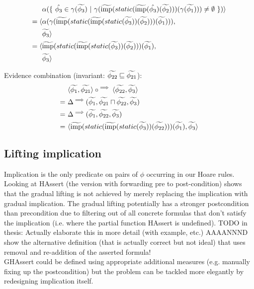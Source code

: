 \documentclass[11pt,a4paper]{article}
\begin{document}
\begin{align*}
&\alpha(\{~ \hat{\phi_3} \in \gamma(\widetilde{\phi_3}) ~|~ \gamma(\widetilde{\textrm{imp}}(static(\widetilde{\textrm{imp}}(\hat{\phi_3})(\widetilde{\phi_2})))(\gamma(\widetilde{\phi_1}))) \neq \emptyset  ~\})
\rangle\\
= \langle 
&\alpha(\gamma(\widetilde{\textrm{imp}}(static(\widetilde{\textrm{imp}}(static(\widetilde{\phi_3}))(\widetilde{\phi_2})))(\widetilde{\phi_1}))), \\
&\widetilde{\phi_3}
\rangle\\
= \langle 
&\widetilde{\textrm{imp}}(static(\widetilde{\textrm{imp}}(static(\widetilde{\phi_3}))(\widetilde{\phi_2})))(\widetilde{\phi_1}), \\
&\widetilde{\phi_3}
\rangle\\
\end{align*}
         
Evidence combination (invariant: $\widetilde{\phi_{22}} \sqsubseteq \widetilde{\phi_{21}}$):
\begin{align*}
   &\langle \widetilde{\phi_1}, \widetilde{\phi_{21}} \rangle \circ^{\implies} \langle \widetilde{\phi_{22}}, \widetilde{\phi_3} \rangle \\
=~ &\Delta^{\implies}(\widetilde{\phi_1}, \widetilde{\phi_{21}} \sqcap \widetilde{\phi_{22}}, \widetilde{\phi_3}) \\
=~ &\Delta^{\implies}(\widetilde{\phi_1}, \widetilde{\phi_{22}}, \widetilde{\phi_3}) \\
=~ &
\langle 
\widetilde{\textrm{imp}}(static(\widetilde{\textrm{imp}}(static(\widetilde{\phi_3}))(\widetilde{\phi_{22}})))(\widetilde{\phi_1}),
\widetilde{\phi_3}
\rangle
\end{align*}
         
\subsection{Lifting implication}
Implication is the only predicate on pairs of $\phi$ occurring in our Hoare rules.\\

Looking at HAssert (the version with forwarding pre to post-condition) shows that the gradual lifting is not achieved by merely replacing the implication with gradual implication.
The gradual lifting potentially has a stronger postcondition than precondition due to filtering out of all concrete formulas that don't satisfy the implication (i.e. where the partial function HAssert is undefined).
TODO in thesis: Actually elaborate this in more detail (with example, etc.) AAAANNND show the alternative definition (that is actually correct but not ideal) that uses removal and re-addition of the asserted formula!\\

GHAssert could be defined using appropriate additional measures (e.g. manually fixing up the postcondition) but the problem can be tackled more elegantly by redesigning implication itself.\\
\end{document}
